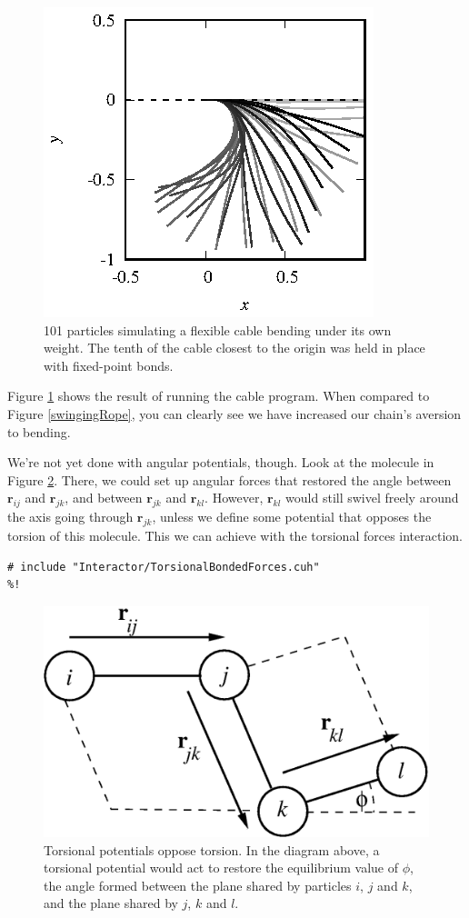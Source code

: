 \begin{figure}
  \centering
  \includegraphics[width = 0.6 \textwidth]{figures/cable.eps}
  \caption{\label{cable}101 particles simulating a flexible cable bending under 
           its own weight. The tenth of the cable closest to the origin was held
           in place with fixed-point bonds.}
\end{figure}

Figure \ref{cable} shows the result of running the cable program. When compared
to Figure \ref{swingingRope}, you can clearly see we have increased our chain's
aversion to bending.

We're not yet done with angular potentials, though. Look at the molecule in 
Figure \ref{torsionalSprings}. There, we could set up angular forces that
restored the angle between $\mathbf{r}_{ij}$ and $\mathbf{r}_{jk}$, and between
$\mathbf{r}_{jk}$ and $\mathbf{r}_{kl}$. However, $\mathbf{r}_{kl}$ would still 
swivel freely around the axis going through $\mathbf{r}_{jk}$, unless we define
some potential that opposes the torsion of this molecule. This we can achieve
with the torsional forces interaction.
\begin{lstlisting}
# include "Interactor/TorsionalBondedForces.cuh"
%!
\end{lstlisting}

\begin{figure}
  \centering
  \includegraphics[width = 0.6 \textwidth]{figures/torsionalSprings.eps}
  \caption{\label{torsionalSprings}Torsional potentials oppose torsion. In the
           diagram above, a torsional potential would act to restore the
           equilibrium value of $\phi$, the angle formed between the plane
           shared by particles $i$, $j$ and $k$, and the plane shared by $j$,
           $k$ and $l$.}
\end{figure}

